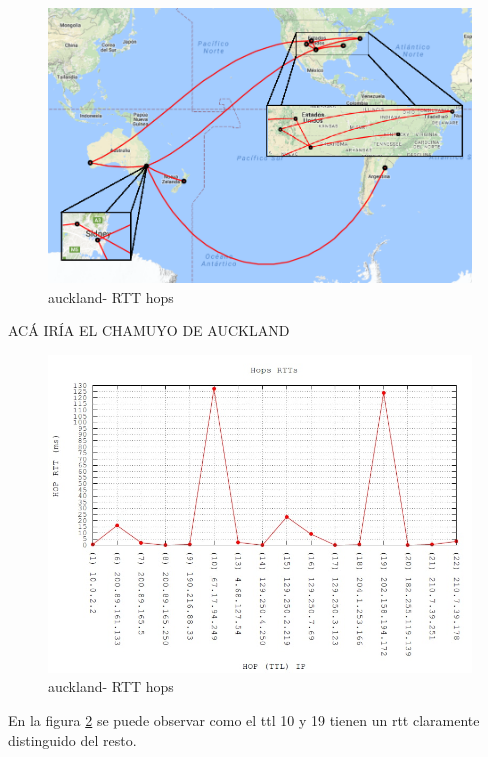 \newpage

\begin{figure}[!htbp]
  \centering
    \includegraphics[scale=0.6]{imagenes/auckland-graficos/mapa-auckland.png}
  \caption{auckland- RTT hops}
  \label{mapa-auckland}
\end{figure}

ACÁ IRÍA EL CHAMUYO DE AUCKLAND

\begin{figure}[!htbp]
  \centering
    \includegraphics[scale=0.6]{imagenes/auckland-graficos/traceroute-auckland.jpg}
  \caption{auckland- RTT hops}
  \label{fig:7}
\end{figure}

En la figura \ref{fig:7} se puede observar como el ttl 10 y 19 tienen un rtt claramente distinguido del resto.

